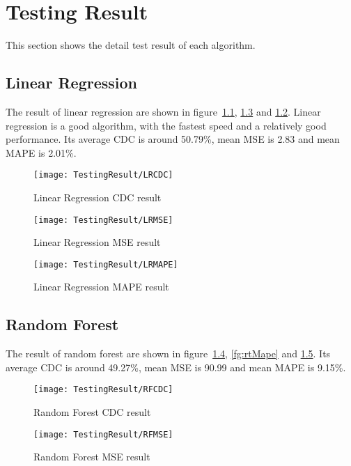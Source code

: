\chapter{Testing Result}
\label{ch:AccuracyResult}

This section shows the detail test result of each algorithm.

\section{Linear Regression}

The result of linear regression are shown in figure~\ref{fg:lrCdc}, \ref{fg:lrMape} and \ref{fg:lrMse}. Linear regression is a good algorithm, with the fastest speed and a relatively good performance. Its average CDC is around 50.79\%, mean MSE is 2.83 and mean MAPE is 2.01\%.

\begin{figure}[h]
	\centering
	\texttt{[image: TestingResult/LRCDC]}
	\caption{Linear Regression CDC result}
	\label{fg:lrCdc}
\end{figure}

\begin{figure}[h]
	\centering
	\texttt{[image: TestingResult/LRMSE]}
	\caption{Linear Regression MSE result}
	\label{fg:lrMse}
\end{figure}

\begin{figure}[h]
	\centering
	\texttt{[image: TestingResult/LRMAPE]}
	\caption{Linear Regression MAPE result}
	\label{fg:lrMape}
\end{figure}

\clearpage

\section{Random Forest}

The result of random forest are shown in figure~\ref{fg:rtCdc}, \ref{fg:rtMape} and \ref{fg:rtMse}. Its average CDC is around 49.27\%, mean MSE is 90.99 and mean MAPE is 9.15\%.

\begin{figure}[h]
	\centering
	\texttt{[image: TestingResult/RFCDC]}
	\caption{Random Forest CDC result}
	\label{fg:rtCdc}
\end{figure}

\begin{figure}[h]
	\centering
	\texttt{[image: TestingResult/RFMSE]}
	\caption{Random Forest MSE result}
	\label{fg:rtMse}
\end{figure}

